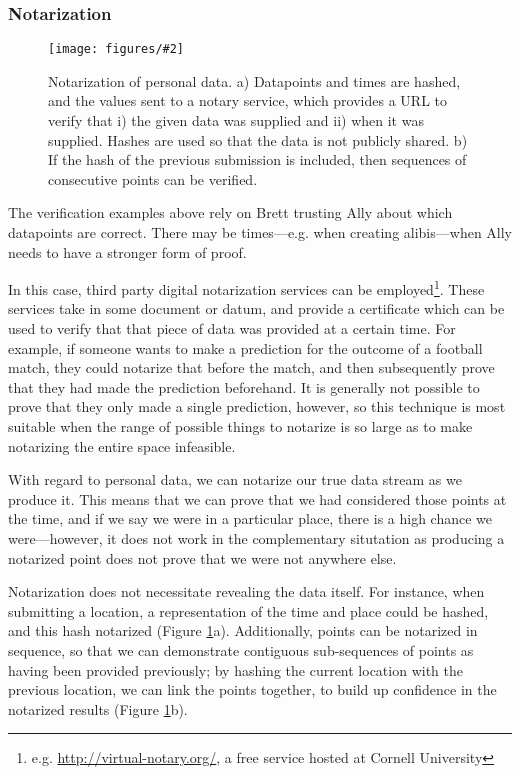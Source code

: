 \documentclass{IOS-Book-Article}     %
\newcommand{\fig}[3][0.9]{
\begin{figure}[tp]
\begin{center}
\texttt{[image: figures/\#2]}
\caption{#3}
\label{fig:#2}
\end{center}
\end{figure}
}
\begin{document}
\subsubsection{Notarization}
\fig{Notarization}{Notarization of personal data. a) Datapoints and times are
hashed, and the values sent to a notary service, which provides a URL to verify
that i) the given data was supplied and ii) when it was supplied. Hashes are
used so that the data is not publicly shared. b) If the hash of the previous
submission is included, then sequences of consecutive points can be verified.}

The verification examples above rely on Brett trusting Ally about which
datapoints are correct. There may be times---e.g. when creating alibis---when
Ally needs to have a stronger form of proof.

In this case, third party digital notarization services can be
employed\footnote{e.g.
\url{http://virtual-notary.org/}, a free service hosted at Cornell University}.
These services take in some document or datum, and provide a certificate which
can be used to verify that that piece of data was provided at a certain time. 
For example, if someone wants to make a prediction
for the outcome of a football match, they could notarize that before the match,
and then subsequently prove that they had made the prediction beforehand. It is
generally not possible to prove that they only made a single prediction,
however, so this technique is most suitable when the range of possible things to notarize
is so large as to make notarizing the entire space infeasible.

With regard to personal data, we can notarize our true data stream as we produce
it. This means that we can prove that we had considered those points at the
time, and if we say we were in a particular place, there is a high chance we
were---however, it does not work in the complementary situtation as producing a
notarized point does not prove that we were not anywhere else.


Notarization does not necessitate revealing the data itself. For instance,
when submitting a location, a representation of the time and place could be
hashed, and this hash notarized (Figure \ref{fig:Notarization}a). Additionally,
points can be notarized in sequence, so that we can demonstrate contiguous sub-sequences 
of points as having been provided previously; by
hashing the current location with the previous location, we can link the points
together, to build up confidence in the notarized results (Figure
\ref{fig:Notarization}b).
\end{document}
